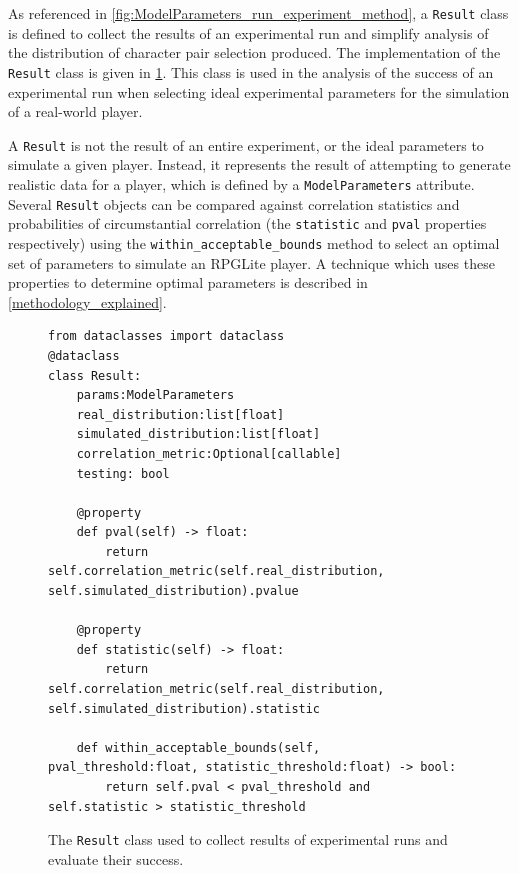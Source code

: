 As referenced in \cref{fig:ModelParameters_run_experiment_method}, a
\lstinline{Result} class is defined to collect the results of an experimental
run and simplify analysis of the distribution of character pair selection
produced. The implementation of the \lstinline{Result} class is given in
\cref{fig:Result_class}. This class is used in the analysis of the success of an
experimental run when selecting ideal experimental parameters for the simulation
of a real-world player.

A \lstinline{Result} is not the result of an entire experiment, or the ideal
parameters to simulate a given player. Instead, it represents the result of
attempting to generate realistic data for a player, which is defined by a
\lstinline{ModelParameters} attribute. Several \lstinline{Result} objects can be
compared against correlation statistics and probabilities of circumstantial correlation
(the \lstinline{statistic} and \lstinline{pval} properties respectively) using
the \lstinline{within_acceptable_bounds} method to
select an optimal set of parameters to simulate an RPGLite player. A technique
which uses these properties to determine optimal parameters is described in
\cref{methodology_explained}.


\begin{figure}[tp]
  \begin{center}
    \begin{lstlisting}
from dataclasses import dataclass
@dataclass
class Result:
    params:ModelParameters
    real_distribution:list[float]
    simulated_distribution:list[float]
    correlation_metric:Optional[callable]
    testing: bool

    @property
    def pval(self) -> float:
        return self.correlation_metric(self.real_distribution, self.simulated_distribution).pvalue

    @property
    def statistic(self) -> float:
        return self.correlation_metric(self.real_distribution, self.simulated_distribution).statistic

    def within_acceptable_bounds(self, pval_threshold:float, statistic_threshold:float) -> bool:
        return self.pval < pval_threshold and self.statistic > statistic_threshold
    \end{lstlisting}
  \end{center}
  \caption{The \lstinline{Result} class used to collect results of experimental
  runs and evaluate their success.}
  \label{fig:Result_class}
\end{figure}


